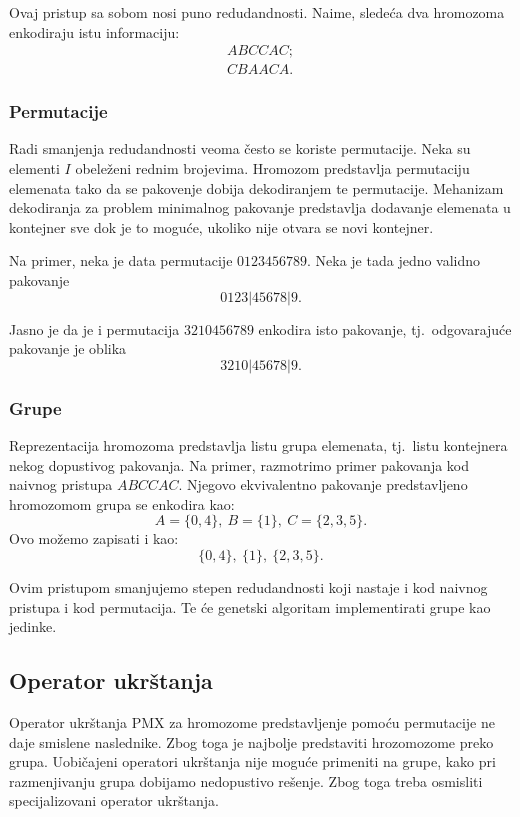 \documentclass[a4paper,12pt,twocolumn]{article}
\begin{document}
Ovaj pristup sa sobom nosi puno redudandnosti. Naime, sledeća dva hromozoma
enkodiraju istu informaciju:
\[
    \begin{aligned}
        ABCCAC; \\
        CBAACA.
    \end{aligned}
\]

\subsubsection{Permutacije}

Radi smanjenja redudandnosti veoma često se koriste permutacije. Neka
su elementi $I$ obeleženi rednim brojevima. Hromozom predstavlja permutaciju
elemenata tako da se pakovenje dobija dekodiranjem te permutacije. 
Mehanizam dekodiranja za problem minimalnog pakovanje predstavlja dodavanje
elemenata u kontejner sve dok je to moguće, ukoliko nije otvara se novi 
kontejner.

Na primer, neka je data permutacije $0123456789$. Neka je tada jedno 
validno pakovanje 
\[0123|45678|9.\]

Jasno je da je i permutacija $3210456789$ enkodira isto pakovanje, tj.\ 
odgovarajuće pakovanje je oblika
\[3210|45678|9.\]

\subsubsection{Grupe}

Reprezentacija hromozoma predstavlja listu grupa elemenata, tj.\ listu
kontejnera nekog dopustivog pakovanja. Na primer, razmotrimo primer pakovanja
kod naivnog pristupa $ABCCAC$. Njegovo ekvivalentno pakovanje predstavljeno
hromozomom grupa se enkodira kao:
\[
    A=\{0, 4\},\ B=\{1\},\ C=\{2, 3, 5\}.
\]
Ovo možemo zapisati i kao:
\[
    \{0, 4\},\ \{1\},\ \{2, 3, 5\}.
\]

Ovim pristupom smanjujemo stepen redudandnosti koji nastaje i kod naivnog 
pristupa i kod permutacija. Te će genetski algoritam implementirati grupe
kao jedinke.

\subsection{Operator ukrštanja}

Operator ukrštanja PMX za hromozome predstavljenje pomoću permutacije ne
daje smislene naslednike\cite{f96}. Zbog toga je najbolje predstaviti 
hrozomozome preko grupa. Uobičajeni operatori ukrštanja nije moguće primeniti
na grupe, kako pri razmenjivanju grupa dobijamo nedopustivo rešenje. 
Zbog toga treba osmisliti specijalizovani operator ukrštanja.
\end{document}
